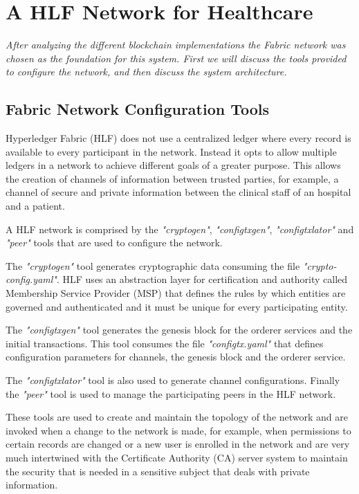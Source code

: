 \documentclass[]{llncs}
\begin{document}
\section{A HLF Network for Healthcare} \label{HLFHealthcare}
\textit{After analyzing the different blockchain implementations the Fabric network was 
chosen as the foundation for this system. 
First we will discuss the tools provided to configure the network, and then discuss 
the system architecture.}

\subsection{Fabric Network Configuration Tools}

Hyperledger Fabric (HLF) does not use a centralized ledger where every record is available to every 
participant in the network. 
Instead it opts to allow multiple ledgers in a network to achieve different goals of a greater purpose. 
This allows the creation of channels of information between trusted parties, 
for example, a channel of secure and private information between the clinical staff of an hospital and a patient.

A HLF network is comprised by the \textit{"cryptogen"}, \textit{"configtxgen"}, 
\textit{"configtxlator"} and \textit{"peer"} tools that are used to configure the network.

The \textit{"cryptogen"} tool generates cryptographic data consuming the file \textit{"crypto-config.yaml"}. 
HLF uses an abstraction layer for certification and authority called Membership Service Provider (MSP) 
that defines the rules by which entities are governed and authenticated and 
it must be unique for every participating entity.

The \textit{"configtxgen"} tool generates the genesis block for the orderer services and the initial transactions. 
This tool consumes the file \textit{"configtx.yaml"} that defines configuration parameters 
for channels, the genesis block and the orderer service.

The \textit{"configtxlator"} tool is also used to generate channel configurations. 
Finally the \textit{"peer"} tool is used to manage the participating peers in the HLF network.

These tools are used to create and maintain the topology of the network and are invoked when a change 
to the network is made, for example, when permissions to certain records are changed or a new user is
enrolled in the network and are very much intertwined with the Certificate Authority (CA) server system
to maintain the security that is needed in a sensitive subject that deals with private information.
\end{document}

